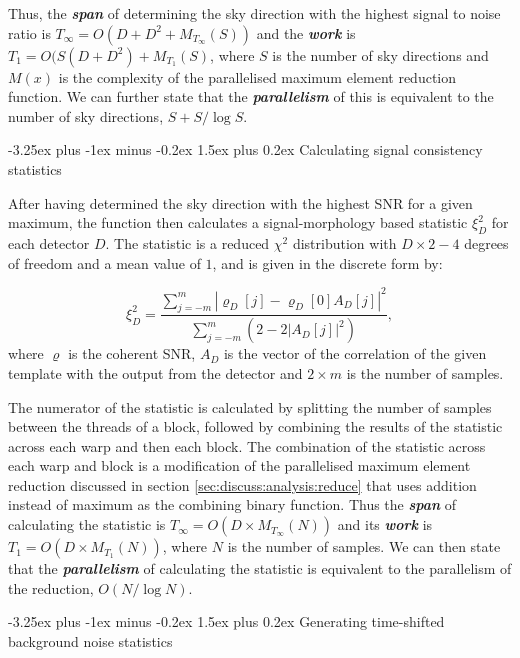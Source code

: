 \documentclass{article}
\makeatletter
\renewcommand{\paragraph}{\@startsection{paragraph}{4}{0ex}%
    {-3.25ex plus -1ex minus -0.2ex}%
    {1.5ex plus 0.2ex}%
    {\normalfont\normalsize\bfseries}}
\makeatother
\begin{document}
Thus, the \textit{\textbf{span}} of determining the sky direction with the highest signal to noise ratio is \(T_\infty = O(D + D^2 + M_{T_\infty}(S))\) and the \textit{\textbf{work}} is \(T_1 = O(S(D + D^2) + M_{T_1}(S)\), where \(S\) is the number of sky directions and \(M(x)\) is the complexity of the parallelised maximum element reduction function.
We can further state that the \textit{\textbf{parallelism}} of this is equivalent to the number of sky directions, \(S + S/\log S\).

\paragraph{Calculating signal consistency statistics} \label{sec:discuss:analysis:stat}

After having determined the sky direction with the highest SNR for a given maximum, the function then calculates a signal-morphology based statistic \(\xi_D^2\) for each detector \(D\).
The statistic is a reduced \(\chi^2\) distribution with \(D\times2 - 4\) degrees of freedom and a mean value of \(1\), and is given in the discrete form by:

\begin{equation} \label{eq:statistic}
    \xi_D^2 = \frac{\sum_{j = -m}^{m} | \varrho_D[j] - \varrho_D[0] A_D[j]|^2}{\sum_{j = -m}^{m} (2 - 2|A_D[j]|^2)},
\end{equation}
where \(\varrho\) is the coherent SNR, \(A_D\) is the vector of the correlation of the given template with the output from the detector and \(2\times{m}\) is the number of samples.

The numerator of the statistic is calculated by splitting the number of samples between the threads of a block, followed by combining the results of the statistic across each warp and then each block.
The combination of the statistic across each warp and block is a modification of the parallelised maximum element reduction discussed in section \ref{sec:discuss:analysis:reduce} that uses addition instead of maximum as the combining binary function.
Thus the \textit{\textbf{span}} of calculating the statistic is \(T_\infty = O(D\times{M_{T_\infty}(N)})\) and its \textit{\textbf{work}} is \(T_1 = O(D\times{M_{T_1}(N)})\), where \(N\) is the number of samples.
We can then state that the \textit{\textbf{parallelism}} of calculating the statistic is equivalent to the parallelism of the reduction, \(O(N/\log N)\).

\paragraph{Generating time-shifted background noise statistics} \label{sec:discuss:analysis:background}
\end{document}
